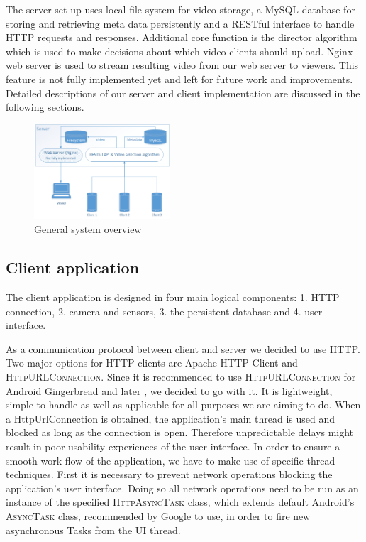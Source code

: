 \documentclass[conference]{IEEEtran}
\begin{document}
The server set up uses local file system for video storage, a MySQL database for storing and retrieving meta data persistently and a RESTful interface to handle HTTP requests and responses.
Additional core function is the director algorithm which is used to make decisions about which video clients should upload.
Nginx web server is used to stream resulting video from our web server to viewers.
This feature is not fully implemented yet and left for future work and improvements.
Detailed descriptions of our server and client implementation are discussed in the following sections.

\begin{figure}[!t]
	\centering
	\includegraphics[width=0.45\textwidth]{sys_arch.png}
	\caption{General system overview}
	\label{fig:gen_arch}
\end{figure}

\subsection{Client application}

The client application is designed in four main logical components: 1. HTTP connection, 2. camera and sensors, 3. the persistent database and 4. user interface.

As a communication protocol between client and server we decided to use HTTP.
Two major options for HTTP clients are Apache HTTP Client and \textsc{HttpURLConnection}.
Since it is recommended to use \textsc{HttpURLConnection} for Android Gingerbread and later \cite{jesse_wilson_androids},
we decided to go with it.
It is lightweight, simple to handle as well as applicable for all purposes we are aiming to do.
When a HttpUrlConnection is obtained, the application's main thread is used and blocked as long as the connection is open.
Therefore unpredictable delays might result in poor usability experiences of the user interface.
In order to ensure a smooth work flow of the application, we have to make use of specific thread techniques.
First it is necessary to prevent network operations blocking the application's user interface.
Doing so all network operations need to be run as an instance 
of the specified \textsc{HttpAsyncTask} class, which extends default Android's \textsc{AsyncTask} class, recommended by Google to use, in order to fire new asynchronous Tasks from the UI thread.
\end{document}
